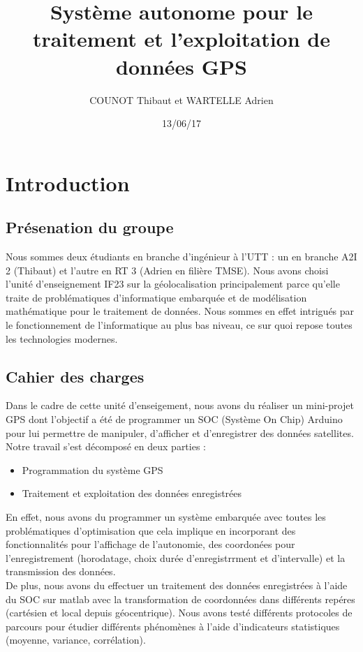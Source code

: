 \documentclass{report}
\title{Système autonome pour le traitement et l'exploitation de données GPS}
\author{COUNOT Thibaut et WARTELLE Adrien}
\date{13/06/17}
\begin{document}
\maketitle
\tableofcontents

\chapter{Introduction}
\section{Présenation du groupe}
Nous sommes deux étudiants en branche d'ingénieur à l'UTT :
un en branche A2I 2 (Thibaut) et l'autre en RT 3 (Adrien en filière TMSE). 
Nous avons choisi l'unité d'enseignement IF23 sur la géolocalisation 
principalement parce qu'elle traite 
de problématiques d'informatique embarquée et de modélisation mathématique
pour le traitement de données. Nous sommes en effet intrigués par le
fonctionnement de l'informatique au plus bas niveau, ce sur quoi repose
toutes les technologies modernes.

\section{Cahier des charges}

Dans le cadre de cette unité d'enseigement, nous avons du réaliser
un mini-projet GPS dont l'objectif a été de programmer un SOC (Système
 On Chip) Arduino pour lui permettre de manipuler, d'afficher et 
 d'enregistrer des données satellites. Notre travail s'est décomposé
 en deux parties :
 \begin{itemize}
 \item Programmation du système GPS
 \item Traitement et exploitation des données enregistrées
 \end{itemize}
 En effet, nous avons du programmer un système embarquée
 avec toutes les problématiques d'optimisation que cela implique
  en incorporant des
 fonctionnalités pour l'affichage de l'autonomie, des coordonées
 pour l'enregistrement (horodatage, choix durée d'enregistrrment
 et d'intervalle) et la transmission des données. \\
 De plus, nous avons du effectuer un traitement des données enregistrées
 à l'aide du SOC sur matlab avec
 la transformation de coordonnées dans différents
 repéres (cartésien et local depuis géocentrique). Nous avons testé
 différents protocoles de parcours pour étudier différents phénomènes
 à l'aide d'indicateurs statistiques (moyenne, variance, corrélation). 
\end{document}
